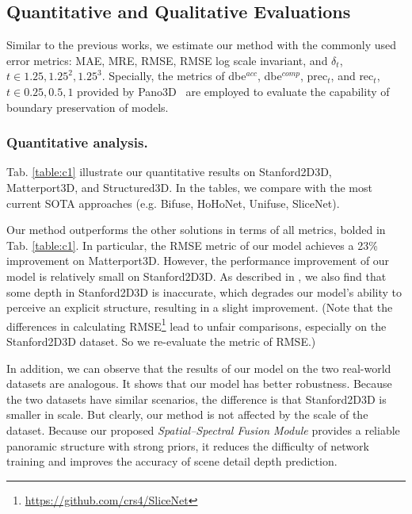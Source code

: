 \documentclass[10pt,times,mathptm,psfig,twocolumn,journals]{IEEEtran}
\begin{document}
 \subsection{Quantitative and Qualitative Evaluations}
 Similar to the previous works, we estimate our method with the commonly used error metrics: MAE, MRE, RMSE, RMSE log scale invariant, and $\delta_{t}$, $t\in {1.25, 1.25^2, 1.25^3}$. Specially, the metrics of dbe$^{acc}$, dbe$^{comp}$, prec$_{t}$, and rec$_{t}$, $t\in {0.25, 0.5, 1}$ provided by Pano3D~\cite{albanis2021pano3d} are employed to evaluate the capability of boundary preservation of models.
  
 \subsubsection{Quantitative analysis.} Tab. \ref{table:c1} illustrate our quantitative results on Stanford2D3D, Matterport3D, and Structured3D. In the tables, we compare with the most current SOTA approaches (e.g. Bifuse\cite{2020BiFuse}, HoHoNet\cite{sun2021hohonet}, Unifuse\cite{Jiang_2021}, SliceNet\cite{Pintore_2021_CVPR}).
 
Our method outperforms the other solutions in terms of all metrics, bolded in Tab. \ref{table:c1}. In particular, the RMSE metric of our model achieves a 23\% improvement on Matterport3D. However, the performance improvement of our model is relatively small on Stanford2D3D. As described in \cite{Jiang_2021}, we also find that some depth in Stanford2D3D is inaccurate, which degrades our model's ability to perceive an explicit structure, resulting in a slight improvement. (Note that the differences in calculating RMSE\footnote{\url{https://github.com/crs4/SliceNet}} lead to unfair comparisons, especially on the Stanford2D3D dataset. So we re-evaluate the metric of RMSE.)

 In addition, we can observe that the results of our model on the two real-world datasets are analogous. It shows that our model has better robustness. Because the two datasets have similar scenarios, the difference is that Stanford2D3D is smaller in scale. But clearly, our method is not affected by the scale of the dataset. Because our proposed \textit{Spatial–Spectral Fusion Module} provides a reliable panoramic structure with strong priors, it reduces the difficulty of network training and improves the accuracy of scene detail depth prediction.
\end{document}
